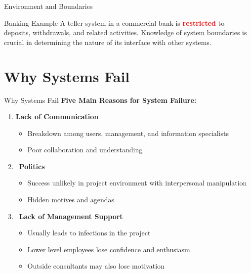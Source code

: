 \documentclass[aspectratio=169]{beamer}
\begin{document}
\begin{frame}{Environment and Boundaries}
    \vspace{0.4cm}
    \begin{exampleblock}{Banking Example}
        A teller system in a commercial bank is \textcolor{red}{\textbf{restricted}} to deposits, withdrawals, and related activities. Knowledge of system boundaries is crucial in determining the nature of its interface with other systems.
    \end{exampleblock}
\end{frame}

\section{Why Systems Fail}

\begin{frame}{Why Systems Fail}
    \textbf{Five Main Reasons for System Failure:}
    
    \begin{enumerate}
        \item   \textbf{Lack of Communication}
        \begin{itemize}
            \item Breakdown among users, management, and information specialists
            \item Poor collaboration and understanding
        \end{itemize}
        
        \item\, \textbf{Politics}
        \begin{itemize}
            \item Success unlikely in project environment with interpersonal manipulation
            \item Hidden motives and agendas
        \end{itemize}
        
        \item\, \textbf{Lack of Management Support}
        \begin{itemize}
            \item Usually leads to infections in the project
            \item Lower level employees lose confidence and enthusiasm
            \item Outside consultants may also lose motivation
        \end{itemize}
    \end{enumerate}
\end{frame}
\end{document}
